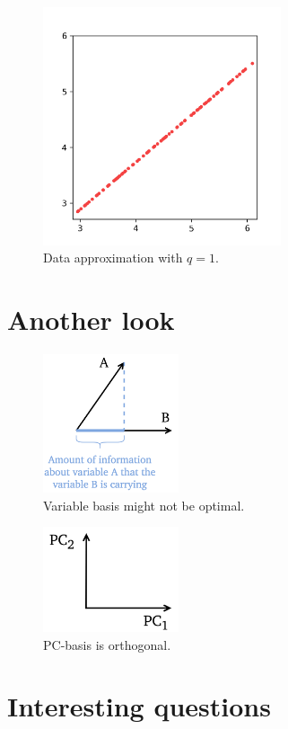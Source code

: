 \documentclass[10pt,twocolumn]{article}
\begin{document}
\begin{figure}[H]
\centering\includegraphics[width=7cm]{python-data-approximation.png}
\caption{Data approximation with $q = 1$.}
\label{fig:python-data-approximation}
\end{figure}

\section{Another look}

\begin{figure}[H]
\centering\includegraphics[width=4cm]{variable-basis.png}
\caption{Variable basis might not be optimal.}
\label{fig:variable-basis}
\end{figure}

\begin{figure}[H]
\centering\includegraphics[width=4cm]{PC-basis.png}
\caption{PC-basis is orthogonal.}
\label{fig:PC-basis}
\end{figure}

\section{Interesting questions}
\end{document}
